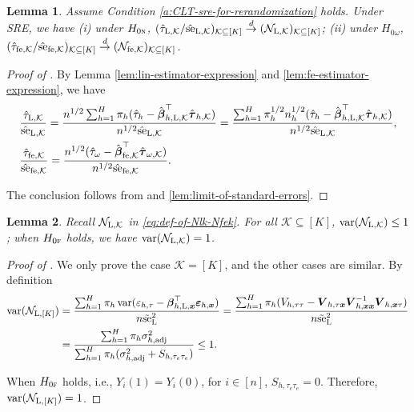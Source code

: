 \documentclass[12pt]{article}
\newtheorem{lemma}{Lemma}
\newcommand{\se}{\textnormal{se}}
\newcommand{\Lin}{\textnormal{L}}
\newcommand{\adj}{\textnormal{adj}}
\newcommand{\var}{\operatorname{var}}
\newcommand{\wconv}{\stackrel{d}{\rightarrow}}
\newcommand{\mk}{\mathcal{K}}
\newcommand{\fe}{\textnormal{fe}}
\newcommand{\bs}{\boldsymbol}
\begin{document}
\begin{lemma}
    \label{lem:limit-of-t-value}
    Assume Condition \ref{a:CLT-sre-for-rerandomization} holds. Under SRE, we have (i) under $H_{0\textsc{n}}$, $(\hat{\tau}_{\Lin,\mk}/\hat{\se}_{\Lin,\mk})_{\mk \subseteq [K]} \wconv (\mathcal{N}_{\Lin,\mk})_{\mk \subseteq [K]}$; (ii) under $H_{0\omega}$, $(\hat{\tau}_{\fe ,\mk}/\hat{\se}_{\fe ,\mk})_{\mk \subseteq [K]} \wconv (\mathcal{N}_{\fe ,\mk})_{\mk \subseteq [K]}$.
\end{lemma}

\begin{proof}[Proof of ]
    By Lemma \ref{lem:lin-estimator-expression} and
\ref{lem:fe-estimator-expression}, we have
\begin{align*}
    &\frac{\hat{\tau}_{\Lin,\mk}}{\hat{\se}_{\Lin,\mk}} = \frac{n^{1/2}\sum_{h=1}^H \pi_h(\hat{\tau}_{h} - \hat{\bs{\beta}}_{h,\Lin,\mk}^\top\hat{\bs{\tau}}_{h,\mk})}{n^{1/2}\hat{\se}_{\Lin,\mk}} = \frac{\sum_{h=1}^H \pi_h^{1/2} n_{h}^{1/2}(\hat{\tau}_{h} - \hat{\bs{\beta}}_{h,\Lin,\mk}^\top\hat{\bs{\tau}}_{h,\mk})}{n^{1/2}\hat{\se}_{\Lin,\mk}},\\
    &\frac{\hat{\tau}_{\fe ,\mk}}{\hat{\se}_{\fe ,\mk}} = \frac{n^{1/2}(\hat{\tau}_{\omega}-\hat{\bs{\beta}}_{\fe , \mk}^\top \hat{\bs{\tau}}_{\omega,\mk})}{n^{1/2}\hat{\se}_{\fe ,\mk}}.
\end{align*}

The conclusion follows from  and \ref{lem:limit-of-standard-errors}.
\end{proof}  

\begin{lemma}
\label{lem:standard-normal-under-fisher-null}
   Recall $\mathcal{N}_{\Lin,\mk}$ in \eqref{eq:def-of-Nlk-Nfek}. For all $\mk\subseteq [K]$, $\var(\mathcal{N}_{\Lin,\mk}) \leq 1$; when $H_{0\textsc{f}}$ holds, we have $\var(\mathcal{N}_{\Lin,\mk}) = 1$.
\end{lemma}
\begin{proof}[Proof of ]
   We only prove the case $\mk = [K]$, and the other cases are similar. By definition
  \begin{align*}
      \var(\mathcal{N}_{\Lin,[K]}) &= \frac{\sum_{h=1}^H \pi_h \var(\varepsilon_{h,\tau}-\bs{\beta}_{h,\Lin, \bs{x}}^\top \bs{\varepsilon}_{h,\bs{x}}) }{n\tilde{\se}_{\Lin}^2} = \frac{\sum_{h=1}^H \pi_h (
V_{h,\tau\tau}- \bs{V}_{h,\tau \bs{x}} \bs{V}_{h,\bs{x}\bs{x}}^{-1} \bs{V}_{h,\bs{x}\tau}) }{n\tilde{\se}_{\Lin}^2} \\
&= \frac{\sum_{h=1}^H \pi_h \sigma_{h, \adj}^2 }{\sum_{h=1}^H \pi_h (\sigma_{h, \adj}^2 + S_{h,\tau_e \tau_e})} \leq 1.
  \end{align*}

 When $H_{0\textsc{f}}$ holds, i.e., $Y_i(1)=Y_i(0)$, for $i\in [n]$, $S_{h,\tau_e \tau_e} = 0$. Therefore, $\var(\mathcal{N}_{\Lin,[K]})=1$.
\end{proof}
\end{document}
